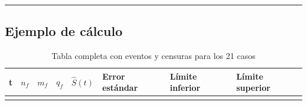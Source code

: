 \documentclass[
]{article}
\begin{document}
\begin{center}\rule{0.5\linewidth}{0.5pt}\end{center}

\subsection{Ejemplo de cálculo}\label{ejemplo-de-cuxe1lculo}

\begin{longtable}[]{@{}
  >{\raggedleft\arraybackslash}p{}
  >{\raggedright\arraybackslash}p{}
  >{\raggedleft\arraybackslash}p{}
  >{\raggedleft\arraybackslash}p{}
  >{\raggedright\arraybackslash}p{}
  >{\raggedright\arraybackslash}p{}
  >{\raggedright\arraybackslash}p{}
  >{\raggedright\arraybackslash}p{}@{}}
\caption{Tabla completa con eventos y censuras para los 21
casos}\tabularnewline
\toprule\noalign{}
\begin{minipage}[b]{\linewidth}\raggedleft
t
\end{minipage} & \begin{minipage}[b]{\linewidth}\raggedright
\(n_f\)
\end{minipage} & \begin{minipage}[b]{\linewidth}\raggedleft
\(m_f\)
\end{minipage} & \begin{minipage}[b]{\linewidth}\raggedleft
\(q_f\)
\end{minipage} & \begin{minipage}[b]{\linewidth}\raggedright
\(\hat{S}(t)\)
\end{minipage} & \begin{minipage}[b]{\linewidth}\raggedright
Error estándar
\end{minipage} & \begin{minipage}[b]{\linewidth}\raggedright
Límite inferior
\end{minipage} & \begin{minipage}[b]{\linewidth}\raggedright
Límite superior
\end{minipage} \\
\midrule\noalign{}
\endfirsthead
\toprule\noalign{}
\begin{minipage}[b]{\linewidth}\raggedleft

\end{minipage}
\end{longtable}
\end{document}
